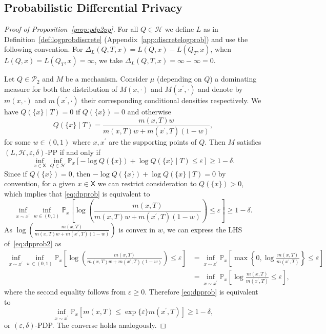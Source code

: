 \documentclass{article}
\theoremstyle{plain}
\theoremstyle{plain}
\theoremstyle{definition}
\theoremstyle{remark}
\theoremstyle{plain}
\renewcommand{\Pr}{\mathbb{P}}
\newcommand{\PrMx}{\Pr_{x}}
\newcommand{\xset}{\mathsf{X}}
\renewcommand{\epsilon}{\varepsilon}
\begin{document}
\subsection{Probabilistic Differential Privacy}\label{proof:pdp2pp}
\begin{proof}[Proof of Proposition~\ref{prop:pdp2pp}]
For all $Q \in \mathcal{H}$ we define $L$ as in Definition~\ref{def:logprobdiscrete} (Appendix~\ref{app:discretelogprob}) and use the following convention. 
For $\Delta_L(Q,T,x) = L(Q,x) - L(Q_T,x)$, when  $L(Q,x) = L(Q_T,x) = \infty$, we take $\Delta_L(Q,T,x) = \infty - \infty=0$.
 
Let $Q \in \mathcal P_2$ and $M$ be a mechanism. Consider $\mu$ (depending on $Q$) a dominating measure for both the distribution of $M(x,\cdot)$ and  $M(x^\prime,\cdot)$ and denote by $m(x,\cdot)$ and $m(x^\prime,\cdot)$ their corresponding conditional densities respectively. We have $Q(\{x\} \mid T) = 0$ if $Q(\{x\})=0$ and otherwise  
\begin{equation*}
    Q(\{x\}\mid T) = \frac{m(x,T)w}{m(x,T)w + m(x^\prime, T)(1-w)},
\end{equation*}
for some $w \in (0,1)$ where $x, x^\prime$ are the supporting points of $Q$. Then 
$M$ satisfies $(L,\mathcal{H},\epsilon,\delta)$-PP if and only if 
\begin{equation}\label{eq:dpprob}
    \inf_{x \in \xset}\inf_{Q \in \mathcal H}\PrMx\left[-\log Q(\{x\}) +\log Q(\{x\}\mid T) \leq \epsilon \right] \geq 1 - \delta.
\end{equation}
Since if $Q(\{x\})=0 $, then $-\log Q(\{x\}) +\log Q(\{x\}\mid T)=0$ by convention, for a given $x \in \xset$ we can restrict consideration to $Q(\{x\})>0$, which implies that \eqref{eq:dpprob} is equivalent to 
\begin{equation}\label{eq:dpprob2}
     \inf_{x \sim x^\prime}\inf_{w \in (0,1)}\PrMx\left[\log \left(  \frac{m(x,T)}{m(x,T)w + m(x^\prime,T)(1-w)} \right)\leq \epsilon \right] \geq 1 - \delta.
\end{equation}
As $\log \left( \frac{m(x,T)}{m(x,T)w + m(x^\prime,T)(1-w)} \right)$ is convex in $w$, we can express the LHS of~\eqref{eq:dpprob2} as 
\begin{align*}
    \inf_{x \sim x^\prime}\inf_{w \in (0,1)}\PrMx\left[\log \left(  \frac{m(x,T)}{m(x,T)w + m(x^\prime,T)(1-w)} \right)\leq \epsilon \right] &= \inf_{x \sim x^\prime}\PrMx\left[ \max \left\{0,\log \frac{m(x,T)}{m(x^\prime,T)}\right\}\leq \epsilon \right] \\
    &=\inf_{x \sim x^\prime} \PrMx\left[\log \frac{m(x,T)}{m(x^\prime,T)}\leq \epsilon \right],
\end{align*}
where the second equality follows from $\varepsilon \ge 0$. 
Therefore \eqref{eq:dpprob} is equivalent to
\begin{equation*}
         \inf_{x \sim x^\prime}\PrMx\left[m(x,T) \leq \exp\{\epsilon\} m(x^\prime, T) \right] \geq 1 - \delta,
    \end{equation*}
or $(\epsilon,\delta)$-PDP. The converse holds analogously.
\end{proof}
\end{document}
